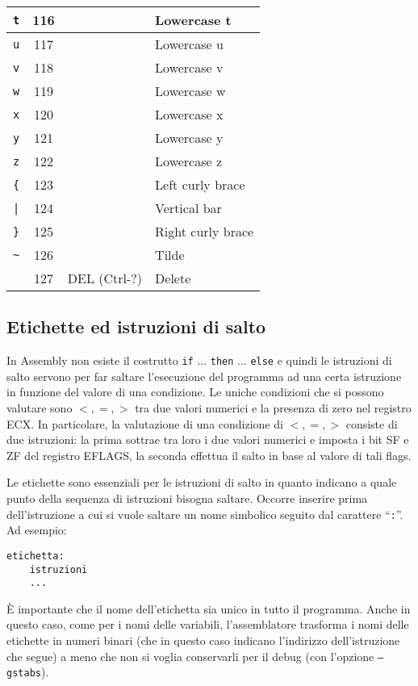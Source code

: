 \documentclass[a4paper]{article}
\theoremstyle{break}
\theoremstyle{break}
\theoremstyle{break}
\theoremstyle{break}
\begin{document}
\begin{xltabular}{\textwidth}{|c|c|c|l|}
	\hline
	\texttt{t} & 116 & & Lowercase t \\
	\hline
	\texttt{u} & 117 & & Lowercase u \\
	\hline
	\texttt{v} & 118 & & Lowercase v \\
	\hline
	\texttt{w} & 119 & & Lowercase w \\
	\hline
	\texttt{x} & 120 & & Lowercase x \\
	\hline
	\texttt{y} & 121 & & Lowercase y \\
	\hline
	\texttt{z} & 122 & & Lowercase z \\
	\hline
	\texttt{\{} & 123 & & Left curly brace \\
	\hline
	\texttt{|} & 124 & & Vertical bar \\
	\hline
	\texttt{\}} & 125 & & Right curly brace \\
	\hline
	\texttt{\textasciitilde} & 126 & & Tilde \\
	\hline
	& 127 & DEL (Ctrl-?) & Delete \\
	\hline
\end{xltabular}

\subsection{Etichette ed istruzioni di salto}
In Assembly non esiste il costrutto \texttt{if} ... \texttt{then} ... \texttt{else}
e quindi le istruzioni di salto
servono per far saltare l'esecuzione del programma ad una certa istruzione in funzione
del valore di una condizione. Le uniche condizioni che si possono valutare sono \(<,=,>\) tra
due valori numerici e la presenza di zero nel registro ECX. In particolare, la valutazione
di una condizione di \(<,=,>\) consiste di due istruzioni: la prima sottrae tra loro i due valori
numerici e imposta i bit SF e ZF del registro EFLAGS, la seconda effettua il salto in base
al valore di tali flags.

\noindent Le etichette sono essenziali per le istruzioni di salto in quanto indicano a quale punto
della sequenza di istruzioni bisogna saltare. Occorre inserire prima dell'istruzione a cui
si vuole saltare un nome simbolico seguito dal carattere “\texttt{:}”. Ad esempio:
\begin{lstlisting}[language={[x86masm]Assembler}]
  etichetta:
    istruzioni
    ...
\end{lstlisting}
È importante che il nome dell'etichetta sia unico in tutto il programma. Anche in questo
caso, come per i nomi delle variabili, l'assemblatore trasforma i nomi delle etichette
in numeri binari (che in questo caso indicano l'indirizzo dell'istruzione che segue) a
meno che non si voglia conservarli per il debug (con l'opzione \texttt{--gstabs}).
\end{document}

